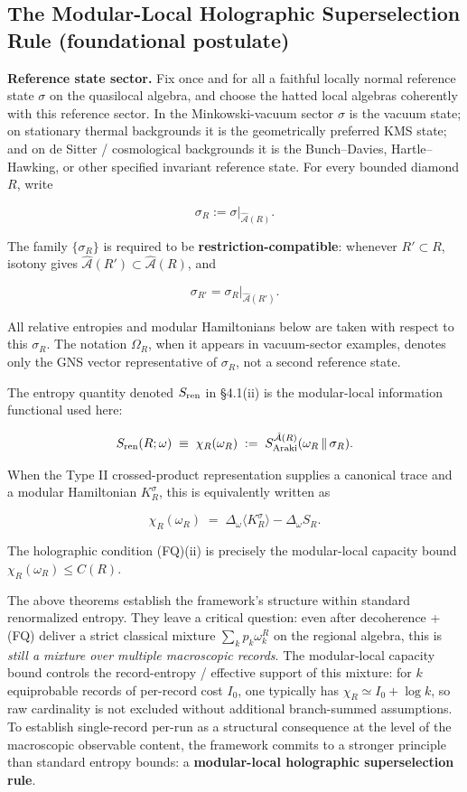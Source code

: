 \documentclass[11pt,a4paper]{article}
\begin{document}
\subsection{The Modular-Local Holographic Superselection Rule (foundational postulate)}

\textbf{Reference state sector.} Fix once and for all a faithful locally normal reference state $\sigma$ on the quasilocal algebra, and choose the hatted local algebras coherently with this reference sector. In the Minkowski-vacuum sector $\sigma$ is the vacuum state; on stationary thermal backgrounds it is the geometrically preferred KMS state; and on de Sitter / cosmological backgrounds it is the Bunch–Davies, Hartle–Hawking, or other specified invariant reference state. For every bounded diamond $R$, write

\[
\sigma_R := \sigma|_{\hat{\mathcal{A}}(R)}.
\]

The family $\{\sigma_R\}$ is required to be \textbf{restriction-compatible}: whenever $R' \subset R$, isotony gives $\hat{\mathcal{A}}(R') \subset \hat{\mathcal{A}}(R)$, and

\[
\sigma_{R'} = \sigma_R |_{\hat{\mathcal{A}}(R')}.
\]

All relative entropies and modular Hamiltonians below are taken with respect to this $\sigma_R$. The notation $\Omega_R$, when it appears in vacuum-sector examples, denotes only the GNS vector representative of $\sigma_R$, not a second reference state.

The entropy quantity denoted $S_{\rm ren}$ in §4.1(ii) is the modular-local information functional used here:

\[
S_{\rm ren}(R; \omega) \;\equiv\; \chi_R(\omega_R) \;:=\; S^{\hat{\mathcal{A}}(R)}_{\rm Araki}(\omega_R \,\|\, \sigma_R).
\]

When the Type II crossed-product representation supplies a canonical trace and a modular Hamiltonian $K_R^\sigma$, this is equivalently written as

\[
\chi_R(\omega_R) \;=\; \Delta_\omega \langle K_R^\sigma \rangle - \Delta_\omega S_R.
\]

The holographic condition (FQ)(ii) is precisely the modular-local capacity bound $\chi_R(\omega_R) \le C(R)$.

The above theorems establish the framework's structure within standard renormalized entropy. They leave a critical question: even after decoherence + (FQ) deliver a strict classical mixture $\sum_k p_k \omega_k^R$ on the regional algebra, this is \emph{still a mixture over multiple macroscopic records}. The modular-local capacity bound controls the record-entropy / effective support of this mixture: for $k$ equiprobable records of per-record cost $I_0$, one typically has $\chi_R \simeq I_0 + \log k$, so raw cardinality is not excluded without additional branch-summed assumptions. To establish single-record per-run as a structural consequence at the level of the macroscopic observable content, the framework commits to a stronger principle than standard entropy bounds: a \textbf{modular-local holographic superselection rule}.
\end{document}
